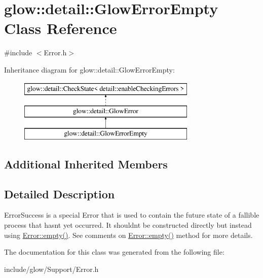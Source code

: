 \hypertarget{classglow_1_1detail_1_1_glow_error_empty}{}\section{glow\+:\+:detail\+:\+:Glow\+Error\+Empty Class Reference}
\label{classglow_1_1detail_1_1_glow_error_empty}


{\ttfamily \#include $<$Error.\+h$>$}

Inheritance diagram for glow\+:\+:detail\+:\+:Glow\+Error\+Empty\+:\begin{figure}[H]
\begin{center}
\leavevmode
\includegraphics[height=3.000000cm]{classglow_1_1detail_1_1_glow_error_empty}
\end{center}
\end{figure}
\subsection*{Additional Inherited Members}


\subsection{Detailed Description}
Error\+Success is a special Error that is used to contain the future state of a fallible process that hasn\textquotesingle{}t yet occurred. It shouldn\textquotesingle{}t be constructed directly but instead using \hyperlink{classglow_1_1detail_1_1_glow_error_afcbda87e6414c7502d8c0b9b8a348efa}{Error\+::empty()}. See comments on \hyperlink{classglow_1_1detail_1_1_glow_error_afcbda87e6414c7502d8c0b9b8a348efa}{Error\+::empty()} method for more details. 

The documentation for this class was generated from the following file\+:\begin{DoxyCompactItemize}
\item 
include/glow/\+Support/Error.\+h\end{DoxyCompactItemize}
